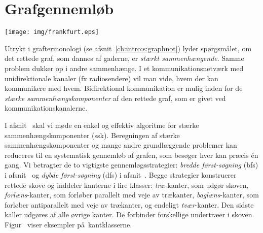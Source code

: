 \chapter{Grafgennemløb}
\renewcommand{\labelprefix}{ch:gtraverse}
\llabel{}
\vspace*{-4.5cm}
\begin{flushright}
\texttt{[image: img/frankfurt.eps]}
\end{flushright}


Utrykt i graftermonologi (se afsnit~\ref{ch:intro:s:graphnot}) lyder spørgsmålet, om det rettede graf, som dannes af gaderne, er \emph{stærkt sammenhængende}.
Samme problem dukker op i andre sammenhænge.
I et kommunikationsnetværk med unidirektionale kanaler (fx radiosendere) vil man vide, hvem der kan kommunikere med hvem.
Bidirektional kommunikation
er mulig inden for de \emph{stærke sammenhængskomponenter}
 af den rettede graf, som er givet ved kommunikationskanalerne.

I afsnit~ skal vi møde en enkel og effektiv algoritme for stærke sammenhængskomponenter (ssk).
Beregningen af stærke sammenhængskomponenter og mange andre grundlæggende problemer kan reduceres til en systematisk gennemløb af grafen, som besøger hver kan præcis én gang.
Vi betragter de to vigtigste gennemløgsstrategier:
\emph{bredde først-søgning} (bfs)
i afsnit~ og
\emph{dybde først-søgning} (dfs)
i afsnit~.
Begge strategier konstruerer rettede skove og inddeler kanterne i fire klasser:
\emph{træ}-kanter, som udgør skoven,
\emph{forlæns}-kanter,
som forløber parallelt med veje av trækanter,
\emph{baglæns}-kanter,
som forløber antiparallelt med veje av trækanter,
og endeligt \emph{tvær}-kanter.
Den sidste kaller udgøres af alle øvrige kanter.
De forbinder forskellige undertræer i skoven.
Figur~ viser eksempler på kantklasserne.


